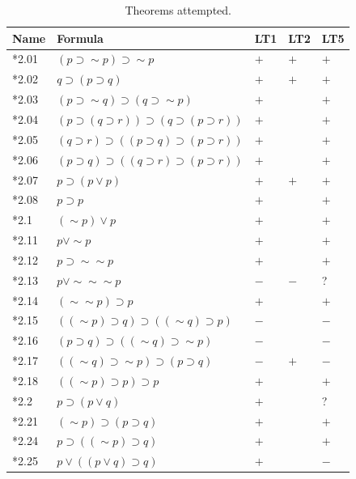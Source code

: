 \documentclass{IEEEcsmag}
\begin{document}
\def\Y{$+$}
\def\N{$-$}

\begin{table}[h]
\centering
\caption{Theorems attempted.}
\label{tab:results}
\begin{tabular}{lllll}
\toprule
\textbf{Name} & \textbf{Formula} & \textbf{LT1} & \textbf{LT2}\cite{LT1957} & \textbf{LT5} \\
\midrule
*2.01 & $(p \supset \sim p) \supset \sim p $ & \Y & \Y \cite[p.~219]{LT1957} & \Y \\
*2.02 & $q \supset (p \supset q) $ & \Y & \Y \cite[p.~224]{LT1957} & \Y \\
*2.03 & $(p \supset \sim q) \supset (q \supset \sim p) $ & \Y & \ & \Y \\
*2.04 & $(p \supset (q \supset r)) \supset (q \supset (p \supset r)) $ & \Y & \ & \Y \\
*2.05 & $(q \supset r) \supset ((p \supset q) \supset (p \supset r)) $ & \Y& \ & \Y \\
*2.06 & $(p \supset q) \supset ((q \supset r) \supset (p \supset r)) $ & \Y& \ & \Y \\
*2.07 & $p \supset (p \vee p) $ & \Y & \Y \cite[p.~226]{LT1957} & \Y \\
*2.08 & $p \supset p $ & \Y & \ & \Y \\
*2.1 & $ (\sim p) \vee p $ & \Y & \ & \Y \\
*2.11 & $p \vee \sim p $ & \Y & \ & \Y \\
*2.12 & $p \supset \sim \sim p $ & \Y & \ & \Y \\
*2.13 & $p \vee \sim \sim \sim p $ & \N & \N \cite[p.~222]{LT1957} & ? \\
*2.14 & $ (\sim \sim p) \supset p $ & \Y & \ & \Y \\
*2.15 & $( (\sim p )\supset q) \supset ( (\sim q) \supset p) $ & \N & \ & \N \\
*2.16 & $(p \supset q) \supset ( (\sim q) \supset \sim p) $ & \N & \ & \N \\
*2.17 & $( (\sim q) \supset \sim p) \supset (p \supset q) $ & \N & \Y \cite[p.~228]{LT1957} & \N \\
*2.18 & $( (\sim p )\supset p) \supset p $ & \Y & \ & \Y \\
*2.2 & $p \supset (p \vee q) $ & \Y & \ & ? \\
*2.21 & $ (\sim p) \supset (p \supset q) $ & \Y & \ & \Y \\
*2.24 & $p \supset ( (\sim p) \supset q) $ & \Y & \ & \Y \\
*2.25 & $p \vee ((p \vee q) \supset q) $ & \Y & \ & \N \\

\end{tabular}
\end{table}
\end{document}
